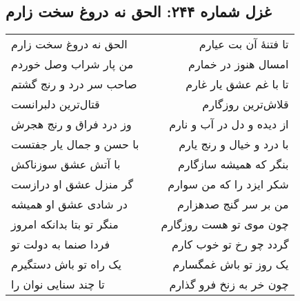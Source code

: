 \begin{center}
\section*{غزل شماره ۲۴۴: الحق نه دروغ سخت زارم}
\label{sec:244}
\begin{longtable}{l p{0.5cm} r}
الحق نه دروغ سخت زارم
&&
تا فتنهٔ آن بت عیارم
\\
من پار شراب وصل خوردم
&&
امسال هنوز در خمارم
\\
صاحب سر درد و رنج گشتم
&&
تا با غم عشق یار غارم
\\
قتال‌ترین دلبرانست
&&
قلاش‌ترین روزگارم
\\
وز درد فراق و رنج هجرش
&&
از دیده و دل در آب و نارم
\\
با حسن و جمال یار جفتست
&&
با درد و خیال و رنج یارم
\\
با آتش عشق سوزناکش
&&
بنگر که همیشه سازگارم
\\
گر منزل عشق او درازست
&&
شکر ایزد را که من سوارم
\\
در شادی عشق او همیشه
&&
من بر سر گنج صدهزارم
\\
منگر تو بتا بدانکه امروز
&&
چون موی تو هست روزگارم
\\
فردا صنما به دولت تو
&&
گردد چو رخ تو خوب کارم
\\
یک راه تو باش دستگیرم
&&
یک روز تو باش غمگسارم
\\
تا چند سنایی نوان را
&&
چون خر به زنخ فرو گذارم
\\
\end{longtable}
\end{center}

